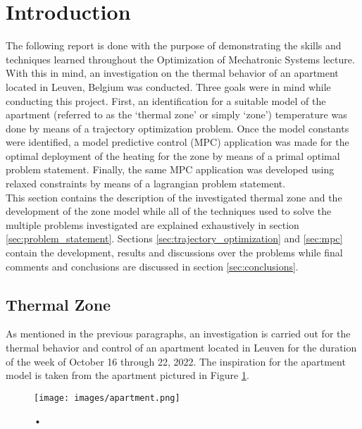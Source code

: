 \section{Introduction}
\label{sec:intro}
The following report is done with the purpose of demonstrating the skills and techniques learned throughout the Optimization of Mechatronic Systems lecture. With this in mind, an investigation on the thermal behavior of an apartment located in Leuven, Belgium was conducted. Three goals were in mind while conducting this project. First, an identification for a suitable model of the apartment (referred to as the `thermal zone' or simply `zone') temperature was done by means of a trajectory optimization problem. Once the model constants were identified, a model predictive control (MPC) application was made for the optimal deployment of the heating for the zone by means of a primal optimal problem statement. Finally, the same MPC application was developed using relaxed constraints by means of a lagrangian problem statement. \\

This section contains the description of the investigated thermal zone and the development of the zone model while all of the techniques used to solve the multiple problems investigated are explained exhaustively in section \ref{sec:problem_statement}. Sections \ref{sec:trajectory_optimization} and \ref{sec:mpc} contain the development, results and discussions over the problems while final comments and conclusions are discussed in section \ref{sec:conclusions}.

\subsection{Thermal Zone}
\label{subsec:thermal_zone}
As mentioned in the previous paragraphs, an investigation is carried out for the thermal behavior and control of an apartment located in Leuven for the duration of the week of October 16 through 22, 2022. The inspiration for the apartment model is taken from the apartment pictured in Figure \ref{fig:apartment}.

\begin{figure}[H]
\centering
\texttt{[image: images/apartment.png]}
\caption{•}
\label{fig:apartment}
\end{figure}


